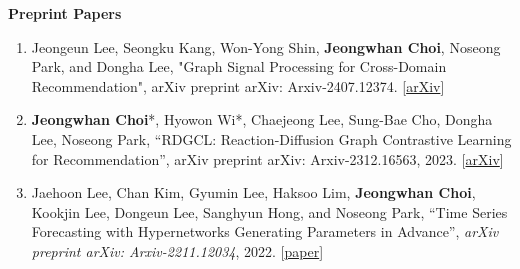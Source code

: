\documentclass[10pt]{article}
\newenvironment{changemargin}[2]{
  \begin{list}{}{
    \setlength{\topsep}{0pt}
    \setlength{\leftmargin}{#1}
    \setlength{\rightmargin}{#2}
    \setlength{\listparindent}{\parindent}
    \setlength{\itemindent}{\parindent}
    \setlength{\parsep}{\parskip}
  }
  \item[]}{\end{list}
}
\newenvironment{body} {
	\vspace*{-16pt}
	\begin{changemargin}{-0.25in}{-0.5in}
  }
	{\end{changemargin}
}
\begin{document}
\begin{body}
\textbf{Preprint Papers}
\begin{enumerate}
    \item Jeongeun Lee, Seongku Kang, Won-Yong Shin, \textbf{Jeongwhan Choi}, Noseong Park, and Dongha Lee, "Graph Signal Processing for Cross-Domain Recommendation", arXiv preprint arXiv: Arxiv-2407.12374. [\href{https://arxiv.org/abs/2407.12374}{arXiv}]
    \item \textbf{Jeongwhan Choi}*, Hyowon Wi*, Chaejeong Lee, Sung-Bae Cho, Dongha Lee, Noseong Park, ``RDGCL: Reaction-Diffusion Graph Contrastive Learning for Recommendation'',  arXiv preprint arXiv: Arxiv-2312.16563, 2023. [\href{https://arxiv.org/abs/2312.16563}{arXiv}]
    \item Jaehoon Lee, Chan Kim, Gyumin Lee, Haksoo Lim, \textbf{Jeongwhan Choi}, Kookjin Lee, Dongeun Lee, Sanghyun Hong, and Noseong Park, ``Time Series Forecasting with Hypernetworks Generating Parameters in Advance'', \emph{arXiv preprint arXiv: Arxiv-2211.12034}, 2022. [\href{https://arxiv.org/abs/2211.12034}{paper}]
\end{enumerate}
\end{body}

\medskip
\end{document}
